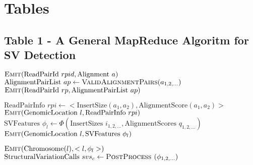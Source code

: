 \documentclass[10pt]{bmc_article}
\newenvironment{bmcformat}{\fussy\setboolean{publ}{true}}{\fussy}
\begin{document}
\begin{bmcformat}

\section*{Tables}

  \subsection*{Table 1 - A General MapReduce Algoritm for SV Detection}
\algrenewcommand{}
  \begin{algorithmic}[1]
    \State $\textsc{Emit}(\textrm{ReadPairId }rpid, \textrm{Alignment }a)$
    \EndFor
    \EndFunction
    \State $\textrm{AlignmentPairList }ap \gets \textsc{ValidAlignmentPairs}(a_{1,2,\ldots})$
    \State $\textsc{Emit}(\textrm{ReadPairId }rp, \textrm{AlignmentPairList } ap)$
    \EndFunction
    \EndProcedure

    \State $ \textrm{ReadPairInfo }rpi \gets <\textrm{InsertSize}(a_1,a_2), \textrm{AlignmentScore}(a_1,a_2)>$
    \State $\textsc{Emit}(\textrm{GenomicLocation }l, \textrm{ReadPairInfo }rpi)$
    \EndFor
    \EndFor
    \EndFunction
    \State $\textrm{SVFeatures } \phi_l \gets \Phi(\textrm{InsertSizes }i_{1,2,\ldots}, \textrm{AlignmentScores }q_{1,2,\ldots})$
    \State $\textsc{Emit}(\textrm{GenomicLocation }l, \textrm{SVFeatures } \phi_l)$
    \EndFunction
    \EndProcedure

    \State $\textsc{Emit}(\textrm{Chromosome}(l), <l,\phi_l>)$
    \EndFunction
    \State $\textrm{StructuralVariationCalls } svs_c \gets \textsc{PostProcess }(\phi_{1,2,\ldots})$
    \EndFunction
    \EndProcedure
  \end{algorithmic}



\end{bmcformat}
\end{document}
